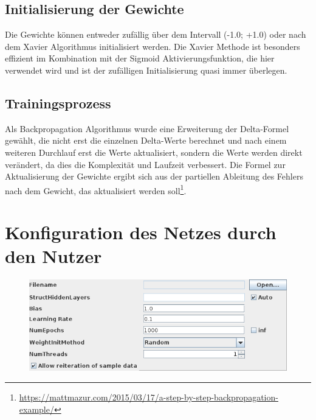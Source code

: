 \documentclass[10pt]{article}
\begin{document}
\subsection*{Initialisierung der Gewichte}
Die Gewichte können entweder zufällig über dem Intervall (-1.0; +1.0) oder nach dem Xavier Algorithmus initialisiert werden. Die Xavier Methode ist besonders effizient im Kombination mit der Sigmoid Aktivierungsfunktion, die hier verwendet wird und ist der zufälligen Initialisierung quasi immer überlegen.

\subsection*{Trainingsprozess}
Als Backpropagation Algorithmus wurde eine Erweiterung der Delta-Formel gewählt, die nicht erst die einzelnen Delta-Werte berechnet und nach einem weiteren Durchlauf erst die Werte aktualisiert, sondern die Werte werden direkt verändert, da dies die Komplexität und Laufzeit verbessert. Die Formel zur Aktualisierung der Gewichte ergibt sich aus der partiellen Ableitung des Fehlers nach dem Gewicht, das aktualisiert werden soll\footnote{\url{https://mattmazur.com/2015/03/17/a-step-by-step-backpropagation-example/}}.


\newpage

\section*{Konfiguration des Netzes durch den Nutzer}
\begin{figure}[htp]
\centering
\includegraphics[scale=1.00]{settings.png}
\end{figure}
\end{document}
